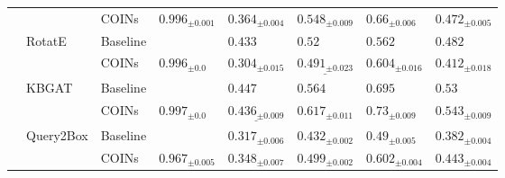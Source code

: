 \begin{table}[ht!]
\begin{adjustbox}{width=\textwidth}
\begin{tabular}{llllllll}
         &           & COINs &  ${{0.996}_{\pm 0.001}}$ &     $\mathbf{{0.364}_{\pm 0.004}}$ &     $\mathbf{{0.548}_{\pm 0.009}}$ &      $\mathbf{{0.66}_{\pm 0.006}}$ &     $\mathbf{{0.472}_{\pm 0.005}}$ \\
         & RotatE & Baseline &                          &                        ${{0.433}}$ &                         ${{0.52}}$ &                        ${{0.562}}$ &                        ${{0.482}}$ \\
         &           & COINs &    ${{0.996}_{\pm 0.0}}$ &            ${{0.304}_{\pm 0.015}}$ &  $\underline{{0.491}_{\pm 0.023}}$ &     $\mathbf{{0.604}_{\pm 0.016}}$ &            ${{0.412}_{\pm 0.018}}$ \\
         & KBGAT & Baseline &                          &                        ${{0.447}}$ &                        ${{0.564}}$ &                        ${{0.695}}$ &                         ${{0.53}}$ \\
         &           & COINs &    ${{0.997}_{\pm 0.0}}$ &  $\underline{{0.436}_{\pm 0.009}}$ &     $\mathbf{{0.617}_{\pm 0.011}}$ &      $\mathbf{{0.73}_{\pm 0.009}}$ &     $\mathbf{{0.543}_{\pm 0.009}}$ \\
         & Query2Box & Baseline &                          &            ${{0.317}_{\pm 0.006}}$ &            ${{0.432}_{\pm 0.002}}$ &             ${{0.49}_{\pm 0.005}}$ &            ${{0.382}_{\pm 0.004}}$ \\
         &           & COINs &  ${{0.967}_{\pm 0.005}}$ &     $\mathbf{{0.348}_{\pm 0.007}}$ &     $\mathbf{{0.499}_{\pm 0.002}}$ &     $\mathbf{{0.602}_{\pm 0.004}}$ &     $\mathbf{{0.443}_{\pm 0.004}}$ \\
\bottomrule
\end{tabular}
  \end{adjustbox}
\end{table}

